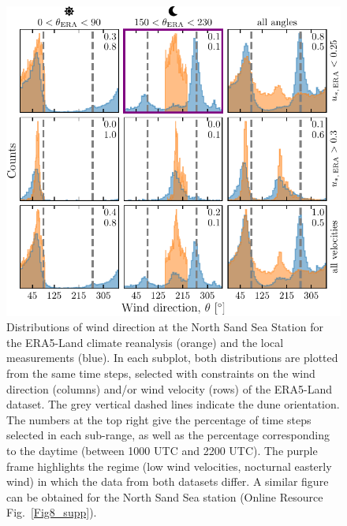 \begin{figure}
\centering
\includegraphics[scale=1]{Figures/Figure3.pdf}
\caption{Distributions of wind direction at the North Sand Sea Station for the ERA5-Land climate reanalysis (orange) and the local measurements (blue). In each subplot, both distributions are plotted from the same time steps, selected with constraints on the wind direction (columns) and/or wind velocity (rows) of the ERA5-Land dataset. The grey vertical dashed lines indicate the dune orientation. The numbers at the top right give the percentage of time steps selected in each sub-range, as well as the percentage corresponding to the daytime (between 1000 UTC and 2200 UTC). The purple frame highlights the regime (low wind velocities, nocturnal easterly wind) in which the data from both datasets differ. A similar figure can be obtained for the North Sand Sea station (Online Resource Fig.~\ref{Fig8_supp}).}
\label{Fig3}
\end{figure}


